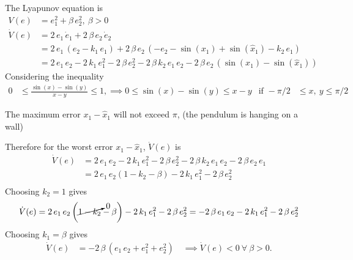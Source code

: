 The Lyapunov equation is 
\begin{align*}
    V(e) &= e_1^2 + \beta\,e_2^2,\ \beta > 0 \\
    \dot V(e) &= 2\,e_1\,\dot e_1 + 2\,\beta\,e_2\,\dot e_2 \\
    &= 2\,e_1\,\left(e_2 - k_1\,e_1\right) + 2\,\beta\,e_2\,\left(-e_2 - \sin\left(x_1\right) + \sin\left(\hat x_1\right) - k_2\,e_1\right) \\
    &= 2\,e_1\,e_2 - 2\,k_1\,e_1^2 - 2\,\beta\,e_2^2 - 2\,\beta\,k_2\,e_1\,e_2 - 2\,\beta\,e_2\,\left(\sin\left(x_1\right) - \sin\left(\hat x_1\right)\right)
\end{align*}
Considering the inequality 
\begin{align*}
    0 &\leq \frac{\sin\left(x\right) - \sin\left(y\right)}{x - y} \leq 1, \implies 0 \leq \sin\left(x\right) - \sin\left(y\right) \leq x - y & \text{if } -\pi/2 &\leq x,\ y \leq \pi/2
\end{align*}

The maximum error $x_1 - \hat x_1$ will not exceed $\pi$, (the pendulum is hanging on a wall)

Therefore for the worst error $x_1 - \hat x_1$, $\dot V(e)$ is 
\begin{align*}
    \dot V(e) &= 2\,e_1\,e_2 - 2\,k_1\,e_1^2 - 2\,\beta\,e_2^2 - 2\,\beta\,k_2\,e_1\,e_2 - 2\,\beta\,e_2\,e_1 \\
    &= 2\,e_1\,e_2\left(1 - k_2 - \beta\right) - 2\,k_1\,e_1^2 - 2\,\beta\,e_2^2\\
\end{align*}
Choosing $k_2 = 1$ gives
\begin{align*}
    \dot V(e) &= 2\,e_1\,e_2\left(\cancelto{0}{1 - k_2} - \beta\right) - 2\,k_1\,e_1^2 - 2\,\beta\,e_2^2 = -2\,\beta\,e_1\,e_2 - 2\,k_1\,e_1^2 - 2\,\beta\,e_2^2\\
\end{align*}
Choosing $k_1 = \beta$ gives
\begin{align*}
    \dot V(e) &= -2\,\beta\,\left(e_1\,e_2 + e_1^2 + e_2^2\right) \quad \implies \dot V(e) < 0\ \forall\ \beta > 0.\\
\end{align*}

